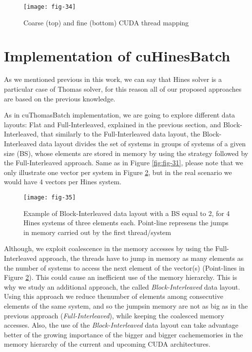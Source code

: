  
 \vspace{1ex}
 \begin{figure}[htbp]
    \centering
    \texttt{[image: fig-34]}
    \caption{Coarse (top) and fine (bottom) CUDA thread mapping}
    \label{fig:fig-34}
\end{figure}


\vspace{10ex}
\section{Implementation of cuHinesBatch}
As we mentioned previous in this work, we can say that Hines solver is a particular
case of Thomas solver, for this reason all of our proposed approaches are based on the
previous knowledge.

As in cuThomasBatch implementation, we are going to explore different data layouts: Flat and Full-Interleaved, explained in the previous section, and Block-Interleaved,
that similarly to the Full-Interleaved data layout, the Block-Interleaved data layout divides the set of systems in groups of systems of a given size (BS), whose elements are
stored in memory by using the strategy followed by the Full-Interleaved approach.
Same as in Figure \ref{fig:fig-31}, please note that we only illustrate one vector per system in
Figure \ref{fig:fig-35}, but in the real scenario we would have 4 vectors per Hines system.

\vspace{1ex}
\begin{figure}[htbp]
   \centering
   \texttt{[image: fig-35]}
   \caption{Example of Block-Interleaved data layout with a BS equal to 2, for 4 Hines
    systems of three elements each. Point-line represens the jumps in memory carried out by the first thread/system}
   \label{fig:fig-35}
\end{figure}

Although, we exploit coalescence in the memory accesses by using the Full-Interleaved
approach, the threads have to jump in memory as many elements as the number of systems to access the next element of the vector(s) (Point-lines in Figure \ref{fig:fig-35}). This could
cause an inefficient use of the memory hierarchy. This is why we study an
 additional approach, the called \textit{Block-Interleaved} data layout.  
 Using this approach we reduce thenumber of elements among consecutive
  elements of the same system, and so the jumpsin memory are not as big
   as in the previous approach (\textit{Full-Interleaved}), 
   while keeping the coalesced memory accesses.  Also, the use of the
   \textit{Block-Interleaved} data layout can take advantage better of the 
    growing importance of the bigger and bigger cachememories in the
     memory hierarchy of the current and upcoming CUDA architectures.

